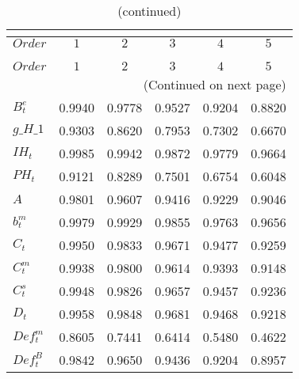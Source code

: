  
\begin{center}
\begin{longtable}{lccccc} 
\caption{COEFFICIENTS OF AUTOCORRELATION}\\
 \label{Table:th_autocorr_matrix}\\
\toprule 
$Order              $	 & 	 $         1$	 & 	 $         2$	 & 	 $         3$	 & 	 $         4$	 & 	 $         5$\\
\midrule \endfirsthead 
\caption{(continued)}\\
 \toprule \\ 
$Order              $	 & 	 $         1$	 & 	 $         2$	 & 	 $         3$	 & 	 $         4$	 & 	 $         5$\\
\midrule \endhead 
\midrule \multicolumn{6}{r}{(Continued on next page)} \\ \bottomrule \endfoot 
\bottomrule \endlastfoot 
$B^e_t              $	 & 	    0.9940	 & 	    0.9778	 & 	    0.9527	 & 	    0.9204	 & 	    0.8820 \\ 
$g\_H\_1            $	 & 	    0.9303	 & 	    0.8620	 & 	    0.7953	 & 	    0.7302	 & 	    0.6670 \\ 
$IH_t               $	 & 	    0.9985	 & 	    0.9942	 & 	    0.9872	 & 	    0.9779	 & 	    0.9664 \\ 
$PH_t               $	 & 	    0.9121	 & 	    0.8289	 & 	    0.7501	 & 	    0.6754	 & 	    0.6048 \\ 
$ A                 $	 & 	    0.9801	 & 	    0.9607	 & 	    0.9416	 & 	    0.9229	 & 	    0.9046 \\ 
$ b^m_t             $	 & 	    0.9979	 & 	    0.9929	 & 	    0.9855	 & 	    0.9763	 & 	    0.9656 \\ 
$ C_t               $	 & 	    0.9950	 & 	    0.9833	 & 	    0.9671	 & 	    0.9477	 & 	    0.9259 \\ 
$ C^m_t             $	 & 	    0.9938	 & 	    0.9800	 & 	    0.9614	 & 	    0.9393	 & 	    0.9148 \\ 
$ C^s_t             $	 & 	    0.9948	 & 	    0.9826	 & 	    0.9657	 & 	    0.9457	 & 	    0.9236 \\ 
$ D_t               $	 & 	    0.9958	 & 	    0.9848	 & 	    0.9681	 & 	    0.9468	 & 	    0.9218 \\ 
$ Def^m_t           $	 & 	    0.8605	 & 	    0.7441	 & 	    0.6414	 & 	    0.5480	 & 	    0.4622 \\ 
$ Def^B_t           $	 & 	    0.9842	 & 	    0.9650	 & 	    0.9436	 & 	    0.9204	 & 	    0.8957 \\ 

\end{longtable}
\end{center}
